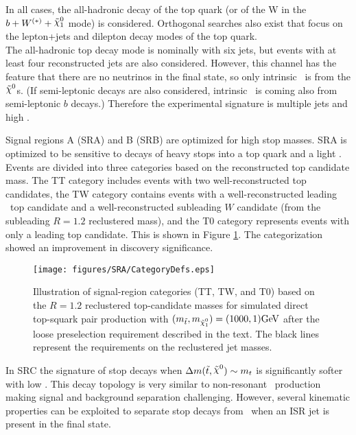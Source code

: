 In all cases, the all-hadronic decay of the top quark (or of the W in the $b + W^{(\ast)}
+ \ninoone$ mode) is considered. Orthogonal searches also exist that
focus on the lepton+jets and dilepton decay modes of the top quark. \\

The all-hadronic top decay mode is nominally
with six jets, but events with at least four reconstructed jets are also
considered. However, this channel has the feature that there are no
neutrinos in the final state, so only intrinsic \met\ is from the
$\nino$s. (If semi-leptonic decays are also considered, intrinsic
\met\ is coming also from semi-leptonic $b$ decays.) Therefore the experimental
signature is multiple jets and high \met. 


Signal regions A (SRA) and B (SRB) are optimized for high stop masses.  SRA is optimized to be sensitive to decays of heavy stops into a top quark and a light \LSP. Events are divided into three categories based on the reconstructed top candidate mass. The TT category includes events with two well-reconstructed top candidates, the TW category contains events with a well-reconstructed leading \pt\ top candidate and a well-reconstructed subleading $W$ candidate (from the subleading $R=1.2$ reclustered mass), and the T0 category represents events with only a leading top candidate. This is shown in Figure \ref{fig:categories}. The categorization showed an improvement in discovery significance. \\


\begin{figure}[t]
  \begin{center}
    \texttt{[image: figures/SRA/CategoryDefs.eps]}
    \caption{Illustration of signal-region categories (TT, TW, and T0) based on the $R=1.2$ reclustered top-candidate masses for simulated direct top-squark pair production with $(m_{\stop},m_{\ninoone})=(1000,1) \GeV$ after the loose preselection requirement described in the text. The black lines represent the requirements on the reclustered jet masses.}
    \label{fig:categories}
  \end{center}
\end{figure}

In SRC the signature of stop decays when $\Delta m(\stop,\LSP)\sim m_{t}$ is significantly softer with low \met. This decay topology is very similar to non-resonant \ttbar\ production making signal and background separation challenging. However, several kinematic properties can be exploited to separate stop decays from \ttbar\ when an ISR jet is present in the final state. \\

